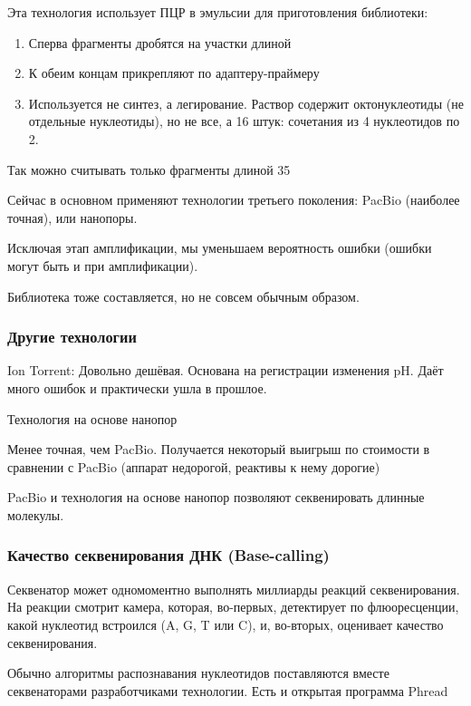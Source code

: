 \documentclass[main.tex]{subfiles}
\begin{document}
Эта технология использует ПЦР в эмульсии для приготовления библиотеки:
\begin{enumerate}[noitemsep]
    \item Сперва фрагменты дробятся на участки длиной
    \item К обеим концам прикрепляют по адаптеру-праймеру
    \item Используется не синтез, а легирование. Раствор содержит октонуклеотиды (не отдельные нуклеотиды), но не все, а 16 штук: сочетания из 4 нуклеотидов по 2.
\end{enumerate}

Так можно считывать только фрагменты длиной 35

Сейчас в основном применяют технологии третьего поколения: PacBio (наиболее точная), или нанопоры.

Исключая этап амплификации, мы уменьшаем вероятность ошибки (ошибки могут быть и при амплификации).

Библиотека тоже составляется, но не совсем обычным образом.


\subsubsection{Другие технологии}
Ion Torrent:
Довольно дешёвая.
Основана на регистрации изменения pH.
Даёт много ошибок и практически ушла в прошлое.

Технология на основе нанопор

Менее точная, чем PacBio.
Получается некоторый выигрыш по стоимости в сравнении с PacBio (аппарат недорогой, реактивы к нему дорогие)

PacBio и технология на основе нанопор позволяют секвенировать длинные молекулы.

\subsubsection{Качество секвенирования ДНК (Base-calling)}

Секвенатор может одномоментно выполнять миллиарды реакций секвенирования.
На реакции смотрит камера, которая, во-первых, детектирует по флюоресценции, какой нуклеотид встроился (A, G, T или C), и, во-вторых, оценивает качество секвенирования.

Обычно алгоритмы распознавания нуклеотидов поставляются вместе секвенаторами разработчиками технологии.
Есть и открытая программа Phread
\end{document}
